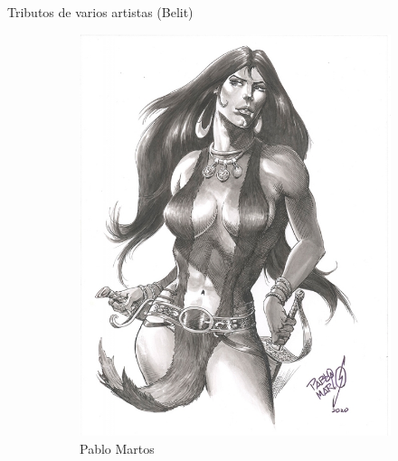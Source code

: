 \begin{frame}{Tributos de varios artistas (Belit)}
\begin{figure}[htp]
\begin{subfigure}[b]{0.22\textwidth}
			\includegraphics[width=\textwidth]{img/tributos/PabloMartos}
			\caption{Pablo Martos}
		\end{subfigure}
		~
		\begin{subfigure}[b]{0.22\textwidth}

\end{subfigure}
\end{figure}
\end{frame}
